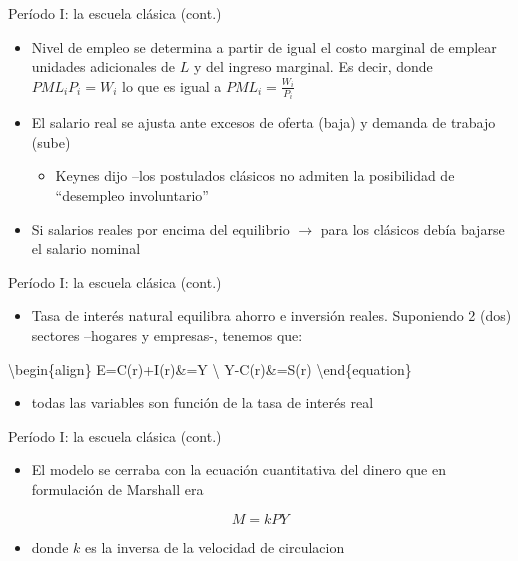 \documentclass[
  ignorenonframetext,
]{beamer}
\providecommand{\tightlist}{%
  \setlength{\itemsep}{0pt}\setlength{\parskip}{0pt}}\usepackage{longtable,booktabs,array}
\begin{document}
\begin{frame}{Período I: la escuela clásica (cont.)}
\protect\hypertarget{peruxedodo-i-la-escuela-cluxe1sica-cont.-1}{}
\begin{itemize}
\tightlist
\item
  Nivel de empleo se determina a partir de igual el costo marginal de
  emplear unidades adicionales de \(L\) y del ingreso marginal. Es
  decir, donde \(PML_{i}P_{i}=W_{i}\) lo que es igual a
  \(PML_{i}=\frac{W_{i}}{P_{i}}\)
\item
  El salario real se ajusta ante excesos de oferta (baja) y demanda de
  trabajo (sube)

  \begin{itemize}
  \tightlist
  \item
    Keynes dijo --los postulados clásicos no admiten la posibilidad de
    ``desempleo involuntario''
  \end{itemize}
\item
  Si salarios reales por encima del equilibrio \(\longrightarrow\) para
  los clásicos debía bajarse el salario nominal
\end{itemize}
\end{frame}

\begin{frame}{Período I: la escuela clásica (cont.)}
\protect\hypertarget{peruxedodo-i-la-escuela-cluxe1sica-cont.-2}{}
\begin{itemize}
\tightlist
\item
  Tasa de interés natural equilibra ahorro e inversión reales.
  Suponiendo 2 (dos) sectores --hogares y empresas-, tenemos que:
\end{itemize}

\textbackslash begin\{align\} E=C(r)+I(r)\&=Y \textbackslash{}
Y-C(r)\&=S(r) \textbackslash end\{equation\}

\begin{itemize}
\tightlist
\item
  todas las variables son función de la tasa de interés real
\end{itemize}
\end{frame}

\begin{frame}{Período I: la escuela clásica (cont.)}
\protect\hypertarget{peruxedodo-i-la-escuela-cluxe1sica-cont.-3}{}
\begin{itemize}
\tightlist
\item
  El modelo se cerraba con la ecuación cuantitativa del dinero que en
  formulación de Marshall era
\end{itemize}

\begin{equation}
M=kPY
\end{equation}

\begin{itemize}
\tightlist
\item
  donde \(k\) es la inversa de la velocidad de circulacion
\end{itemize}
\end{frame}
\end{document}
